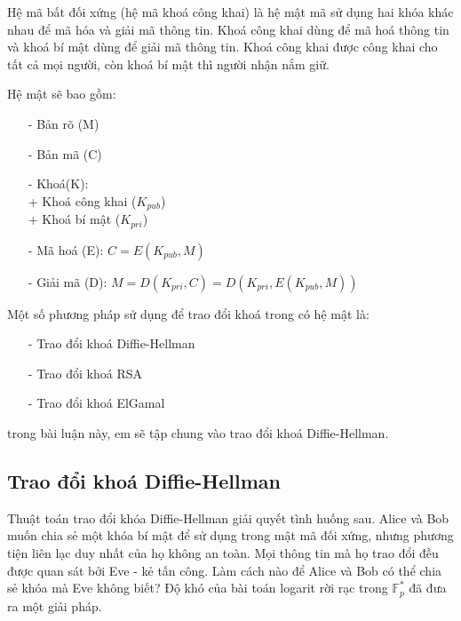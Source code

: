 Hệ mã bất đối xứng (hệ mã khoá công khai) là hệ mật mã sử dụng hai khóa khác nhau để mã hóa và giải mã thông tin.
Khoá công khai dùng để mã hoá thông tin và khoá bí mật dùng để giải mã thông tin. Khoá công khai được công khai 
cho tất cả mọi người, còn khoá bí mật thì người nhận nắm giữ.


Hệ mật sẽ bao gồm:
\begin{itemize}
    \item[-] Bản rõ (M)
    \item[-] Bản mã (C)
    \item[-] Khoá(K): 
        \\+ Khoá công khai ($K_{pub}$)
        \\+ Khoá bí mật ($K_{pri}$) 
    \item[-] Mã hoá (E): $C = E(K_{pub},M)$
    \item[-] Giải mã (D): $M = D(K_{pri},C) = D(K_{pri},E(K_{pub},M))$
\end{itemize}

Một số phương pháp sử dụng để trao đổi khoá trong có hệ mật là:
\begin{itemize}
    \item[-] Trao đổi khoá Diffie-Hellman
    \item[-] Trao đổi khoá RSA
    \item[-] Trao đổi khoá ElGamal
\end{itemize}

trong bài luận này, em sẽ tập chung vào trao đổi khoá Diffie-Hellman.
\subsection{Trao đổi khoá Diffie-Hellman}

Thuật toán trao đổi khóa Diffie-Hellman giải quyết tình huống sau. Alice và
Bob muốn chia sẻ một khóa bí mật để sử dụng trong mật mã đối xứng, nhưng
phương tiện liên lạc duy nhất của họ không an toàn. Mọi thông tin mà họ trao
đổi đều được quan sát bởi Eve - kẻ tấn công. Làm cách nào để Alice và Bob có
thể chia sẻ khóa mà Eve không biết? Độ khó của bài toán logarit rời
rạc trong $\mathbb{F}^*_p$ đã đưa ra một giải pháp.



